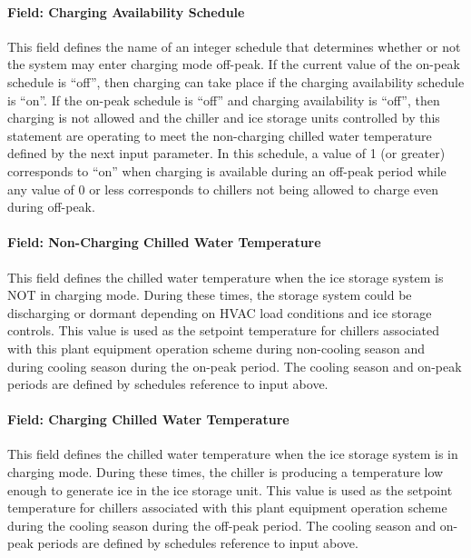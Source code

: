 \paragraph{Field: Charging Availability Schedule}\label{field-charging-availability-schedule}

This field defines the name of an integer schedule that determines whether or not the system may enter charging mode off-peak. If the current value of the on-peak schedule is ``off'', then charging can take place if the charging availability schedule is ``on''. If the on-peak schedule is ``off'' and charging availability is ``off'', then charging is not allowed and the chiller and ice storage units controlled by this statement are operating to meet the non-charging chilled water temperature defined by the next input parameter. In this schedule, a value of 1 (or greater) corresponds to ``on'' when charging is available during an off-peak period while any value of 0 or less corresponds to chillers not being allowed to charge even during off-peak.

\paragraph{Field: Non-Charging Chilled Water Temperature}\label{field-non-charging-chilled-water-temperature}

This field defines the chilled water temperature when the ice storage system is NOT in charging mode. During these times, the storage system could be discharging or dormant depending on HVAC load conditions and ice storage controls. This value is used as the setpoint temperature for chillers associated with this plant equipment operation scheme during non-cooling season and during cooling season during the on-peak period. The cooling season and on-peak periods are defined by schedules reference to input above.

\paragraph{Field: Charging Chilled Water Temperature}\label{field-charging-chilled-water-temperature}

This field defines the chilled water temperature when the ice storage system is in charging mode. During these times, the chiller is producing a temperature low enough to generate ice in the ice storage unit. This value is used as the setpoint temperature for chillers associated with this plant equipment operation scheme during the cooling season during the off-peak period. The cooling season and on-peak periods are defined by schedules reference to input above.

